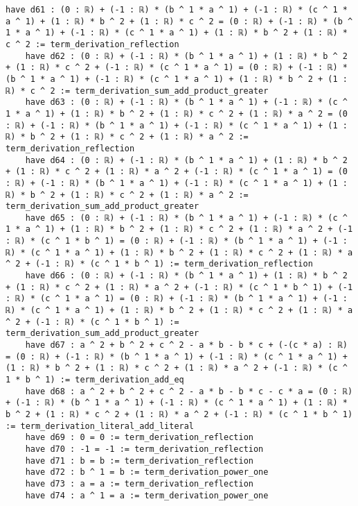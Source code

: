 \documentclass{article}
\begin{document}
\begin{tcolorbox}[colback=white!10, width=\linewidth]
\begin{lstlisting}[language=Lean4]
    have d61 : (0 : ℝ) + (-1 : ℝ) * (b ^ 1 * a ^ 1) + (-1 : ℝ) * (c ^ 1 * a ^ 1) + (1 : ℝ) * b ^ 2 + (1 : ℝ) * c ^ 2 = (0 : ℝ) + (-1 : ℝ) * (b ^ 1 * a ^ 1) + (-1 : ℝ) * (c ^ 1 * a ^ 1) + (1 : ℝ) * b ^ 2 + (1 : ℝ) * c ^ 2 := term_derivation_reflection
    have d62 : (0 : ℝ) + (-1 : ℝ) * (b ^ 1 * a ^ 1) + (1 : ℝ) * b ^ 2 + (1 : ℝ) * c ^ 2 + (-1 : ℝ) * (c ^ 1 * a ^ 1) = (0 : ℝ) + (-1 : ℝ) * (b ^ 1 * a ^ 1) + (-1 : ℝ) * (c ^ 1 * a ^ 1) + (1 : ℝ) * b ^ 2 + (1 : ℝ) * c ^ 2 := term_derivation_sum_add_product_greater
    have d63 : (0 : ℝ) + (-1 : ℝ) * (b ^ 1 * a ^ 1) + (-1 : ℝ) * (c ^ 1 * a ^ 1) + (1 : ℝ) * b ^ 2 + (1 : ℝ) * c ^ 2 + (1 : ℝ) * a ^ 2 = (0 : ℝ) + (-1 : ℝ) * (b ^ 1 * a ^ 1) + (-1 : ℝ) * (c ^ 1 * a ^ 1) + (1 : ℝ) * b ^ 2 + (1 : ℝ) * c ^ 2 + (1 : ℝ) * a ^ 2 := term_derivation_reflection
    have d64 : (0 : ℝ) + (-1 : ℝ) * (b ^ 1 * a ^ 1) + (1 : ℝ) * b ^ 2 + (1 : ℝ) * c ^ 2 + (1 : ℝ) * a ^ 2 + (-1 : ℝ) * (c ^ 1 * a ^ 1) = (0 : ℝ) + (-1 : ℝ) * (b ^ 1 * a ^ 1) + (-1 : ℝ) * (c ^ 1 * a ^ 1) + (1 : ℝ) * b ^ 2 + (1 : ℝ) * c ^ 2 + (1 : ℝ) * a ^ 2 := term_derivation_sum_add_product_greater
    have d65 : (0 : ℝ) + (-1 : ℝ) * (b ^ 1 * a ^ 1) + (-1 : ℝ) * (c ^ 1 * a ^ 1) + (1 : ℝ) * b ^ 2 + (1 : ℝ) * c ^ 2 + (1 : ℝ) * a ^ 2 + (-1 : ℝ) * (c ^ 1 * b ^ 1) = (0 : ℝ) + (-1 : ℝ) * (b ^ 1 * a ^ 1) + (-1 : ℝ) * (c ^ 1 * a ^ 1) + (1 : ℝ) * b ^ 2 + (1 : ℝ) * c ^ 2 + (1 : ℝ) * a ^ 2 + (-1 : ℝ) * (c ^ 1 * b ^ 1) := term_derivation_reflection
    have d66 : (0 : ℝ) + (-1 : ℝ) * (b ^ 1 * a ^ 1) + (1 : ℝ) * b ^ 2 + (1 : ℝ) * c ^ 2 + (1 : ℝ) * a ^ 2 + (-1 : ℝ) * (c ^ 1 * b ^ 1) + (-1 : ℝ) * (c ^ 1 * a ^ 1) = (0 : ℝ) + (-1 : ℝ) * (b ^ 1 * a ^ 1) + (-1 : ℝ) * (c ^ 1 * a ^ 1) + (1 : ℝ) * b ^ 2 + (1 : ℝ) * c ^ 2 + (1 : ℝ) * a ^ 2 + (-1 : ℝ) * (c ^ 1 * b ^ 1) := term_derivation_sum_add_product_greater
    have d67 : a ^ 2 + b ^ 2 + c ^ 2 - a * b - b * c + (-(c * a) : ℝ) = (0 : ℝ) + (-1 : ℝ) * (b ^ 1 * a ^ 1) + (-1 : ℝ) * (c ^ 1 * a ^ 1) + (1 : ℝ) * b ^ 2 + (1 : ℝ) * c ^ 2 + (1 : ℝ) * a ^ 2 + (-1 : ℝ) * (c ^ 1 * b ^ 1) := term_derivation_add_eq
    have d68 : a ^ 2 + b ^ 2 + c ^ 2 - a * b - b * c - c * a = (0 : ℝ) + (-1 : ℝ) * (b ^ 1 * a ^ 1) + (-1 : ℝ) * (c ^ 1 * a ^ 1) + (1 : ℝ) * b ^ 2 + (1 : ℝ) * c ^ 2 + (1 : ℝ) * a ^ 2 + (-1 : ℝ) * (c ^ 1 * b ^ 1) := term_derivation_literal_add_literal
    have d69 : 0 = 0 := term_derivation_reflection
    have d70 : -1 = -1 := term_derivation_reflection
    have d71 : b = b := term_derivation_reflection
    have d72 : b ^ 1 = b := term_derivation_power_one
    have d73 : a = a := term_derivation_reflection
    have d74 : a ^ 1 = a := term_derivation_power_one

\end{lstlisting}
\end{tcolorbox}
\end{document}
